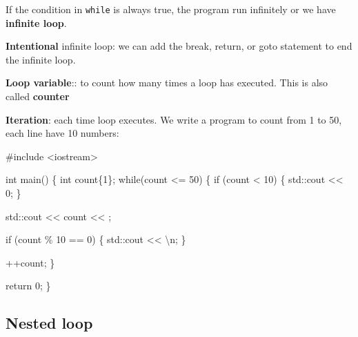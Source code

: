 \documentclass[
  letterpaper,
  DIV=11,
  numbers=noendperiod]{scrreprt}
\newenvironment{Shaded}{\begin{snugshade}}{\end{snugshade}}
\newcommand{\CommentTok}[1]{\textcolor[rgb]{0.37,0.37,0.37}{#1}}
\newcommand{\ControlFlowTok}[1]{\textcolor[rgb]{0.00,0.23,0.31}{#1}}
\newcommand{\DecValTok}[1]{\textcolor[rgb]{0.68,0.00,0.00}{#1}}
\newcommand{\ErrorTok}[1]{\textcolor[rgb]{0.68,0.00,0.00}{#1}}
\newcommand{\FunctionTok}[1]{\textcolor[rgb]{0.28,0.35,0.67}{#1}}
\newcommand{\NormalTok}[1]{\textcolor[rgb]{0.00,0.23,0.31}{#1}}
\newcommand{\SpecialCharTok}[1]{\textcolor[rgb]{0.37,0.37,0.37}{#1}}
\newcommand{\StringTok}[1]{\textcolor[rgb]{0.13,0.47,0.30}{#1}}
\begin{document}
If the condition in \texttt{while} is always true, the program run
infinitely or we have \textbf{infinite loop}.

\textbf{Intentional} infinite loop: we can add the break, return, or
goto statement to end the infinite loop.

\textbf{Loop variable}:: to count how many times a loop has executed.
This is also called \textbf{counter}

\textbf{Iteration}: each time loop executes. We write a program to count
from 1 to 50, each line have 10 numbers:

\begin{Shaded}
\begin{Highlighting}[]
\CommentTok{\#include \textless{}iostream\textgreater{}}

\NormalTok{int }\FunctionTok{main}\NormalTok{()}
\NormalTok{\{}
\NormalTok{    int count\{}\DecValTok{1}\NormalTok{\};}
    \ControlFlowTok{while}\NormalTok{(count }\SpecialCharTok{\textless{}=} \DecValTok{50}\NormalTok{)}
\NormalTok{    \{}
        \ControlFlowTok{if}\NormalTok{ (count }\SpecialCharTok{\textless{}} \DecValTok{10}\NormalTok{)}
\NormalTok{        \{}
\NormalTok{            std}\SpecialCharTok{::}\NormalTok{cout }\SpecialCharTok{\textless{}}\ErrorTok{\textless{}} \StringTok{\textquotesingle{}0\textquotesingle{}}\NormalTok{;}
\NormalTok{        \}}
        
\NormalTok{        std}\SpecialCharTok{::}\NormalTok{cout }\SpecialCharTok{\textless{}}\ErrorTok{\textless{}}\NormalTok{ count }\SpecialCharTok{\textless{}}\ErrorTok{\textless{}} \StringTok{\textquotesingle{} \textquotesingle{}}\NormalTok{;}
        
        \ControlFlowTok{if}\NormalTok{ (count \% }\DecValTok{10} \SpecialCharTok{==} \DecValTok{0}\NormalTok{)}
\NormalTok{        \{}
\NormalTok{            std}\SpecialCharTok{::}\NormalTok{cout }\SpecialCharTok{\textless{}}\ErrorTok{\textless{}} \StringTok{\textquotesingle{}}\SpecialCharTok{\textbackslash{}n}\StringTok{\textquotesingle{}}\NormalTok{;}
\NormalTok{        \}}
        
        \SpecialCharTok{++}\NormalTok{count;}
\NormalTok{    \}}
    
\NormalTok{    return }\DecValTok{0}\NormalTok{;}
\NormalTok{\}}
\end{Highlighting}
\end{Shaded}

\hypertarget{nested-loop}{%
\subsection{Nested loop}\label{nested-loop}}
\end{document}
